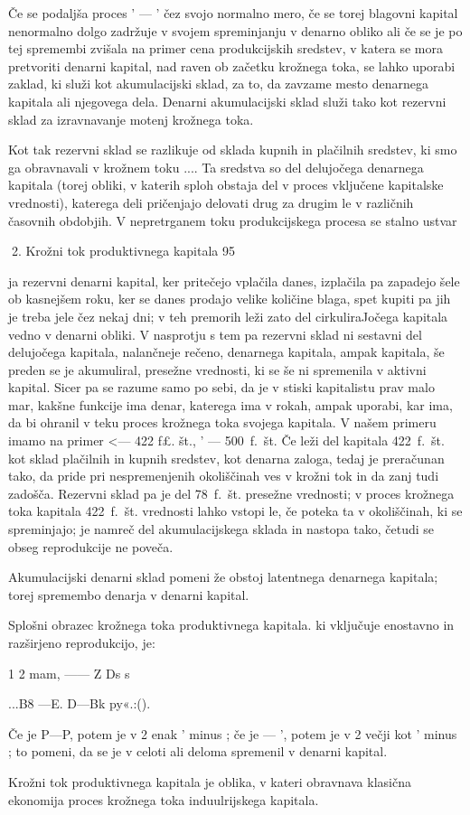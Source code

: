 \documentclass[kapital_02.tex]{subfiles}
\begin{document}
Če se podaljša proces \KPEB' — \KPED' čez svojo normalno mero, če se torej blagovni kapital nenormalno dolgo zadržuje v svojem spreminjanju v denarno obliko ali če se je po tej spremembi zvišala na primer cena produkcijskih sredstev, v katera se mora pretvoriti denarni kapital, nad raven ob začetku krožnega toka, se lahko uporabi zaklad, ki služi kot akumulacijski sklad, za to, da zavzame mesto denarnega kapitala ali njegovega dela. Denarni akumulacijski sklad služi tako kot rezervni sklad za izravnavanje motenj krožnega toka.

Kot tak rezervni sklad se razlikuje od sklada kupnih in plačilnih sredstev, ki smo ga obravnavali v krožnem toku \KPEP...\KPEP. Ta sredstva so del delujočega denarnega kapitala (torej obliki, v katerih sploh obstaja del v proces vključene kapitalske vrednosti), katerega deli pričenjajo delovati drug za drugim le v različnih časovnih obdobjih. V nepretrganem toku produkcijskega procesa se stalno ustvar

 2. Krožni tok produktivnega kapitala 95



 ja rezervni denarni kapital, ker pritečejo vplačila danes, izplačila pa zapadejo šele ob kasnejšem roku, ker se danes prodajo velike količine blaga, spet kupiti pa jih je treba jele čez nekaj dni; v teh premorih leži zato del cirkuliraJočega kapitala vedno v denarni obliki. V nasprotju s tem pa rezervni sklad ni sestavni del delujočega kapitala, nalančneje rečeno, denarnega kapitala, ampak kapitala, še preden se je akumuliral, presežne vrednosti, ki se še ni spremenila v aktivni kapital. Sicer pa se razume samo po sebi, da je v stiski kapitalistu prav malo mar, kakšne funkcije ima denar, katerega ima v rokah, ampak uporabi, kar ima, da bi ohranil v teku proces krožnega toka svojega kapitala. V našem primeru imamo na primer \KPED <— 422 f£. št., \KPED' — 500~f.~št. Če leži del kapitala 422~f.~št. kot sklad plačilnih in kupnih sredstev, kot denarna zaloga, tedaj je preračunan tako, da pride pri nespremenjenih okoliščinah ves v krožni tok in da zanj tudi zadošča. Rezervni sklad pa je del 78~f.~št. presežne vrednosti; v proces krožnega toka kapitala 422~f.~št. vrednosti lahko vstopi le, če poteka ta v okoliščinah, ki se spreminjajo; je namreč del akumulacijskega sklada in nastopa tako, četudi se obseg reprodukcije ne poveča.

Akumulacijski denarni sklad pomeni že obstoj latentnega denarnega kapitala; torej spremembo denarja v denarni kapital.

Splošni obrazec krožnega toka produktivnega kapitala. ki vključuje enostavno in razširjeno reprodukcijo, je:

1 2 mam, —— Z Ds s

\KPEP...B8 —E. D—Bk py«.:\KPEP (\KPEP).

Če je P—P, potem je \KPED v 2 enak \KPED' minus \KPEd; če je \KPEP — \KPEP', potem je \KPED v 2 večji kot \KPED' minus \KPEd; to pomeni, da se je \KPEd v celoti ali deloma spremenil v denarni kapital.

Krožni tok produktivnega kapitala je oblika, v kateri obravnava klasična ekonomija proces krožnega toka induulrijskega kapitala.

 

\end{document}
